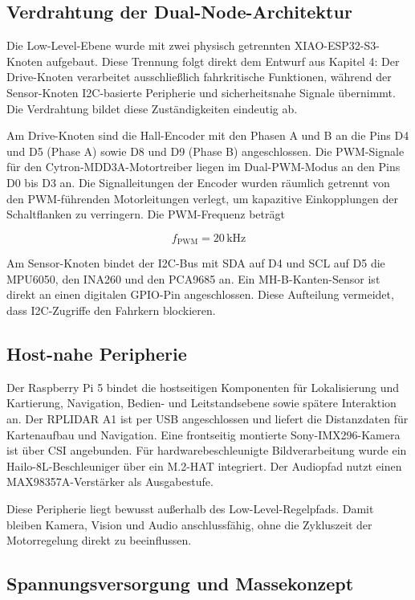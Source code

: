 \subsection{Verdrahtung der Dual-Node-Architektur}

Die Low-Level-Ebene wurde mit zwei physisch getrennten XIAO-ESP32-S3-Knoten aufgebaut. Diese Trennung folgt direkt dem Entwurf aus Kapitel 4: Der Drive-Knoten verarbeitet ausschließlich fahrkritische Funktionen, während der Sensor-Knoten I2C-basierte Peripherie und sicherheitsnahe Signale übernimmt. Die Verdrahtung bildet diese Zuständigkeiten eindeutig ab.

Am Drive-Knoten sind die Hall-Encoder mit den Phasen A und B an die Pins D4 und D5 (Phase A) sowie D8 und D9 (Phase B) angeschlossen. Die PWM-Signale für den Cytron-MDD3A-Motortreiber liegen im Dual-PWM-Modus an den Pins D0 bis D3 an. Die Signalleitungen der Encoder wurden räumlich getrennt von den PWM-führenden Motorleitungen verlegt, um kapazitive Einkopplungen der Schaltflanken zu verringern. Die PWM-Frequenz beträgt

$$f_{\mathrm{PWM}} = 20\,\mathrm{kHz}$$

Am Sensor-Knoten bindet der I2C-Bus mit SDA auf D4 und SCL auf D5 die MPU6050, den INA260 und den PCA9685 an. Ein MH-B-Kanten-Sensor ist direkt an einen digitalen GPIO-Pin angeschlossen. Diese Aufteilung vermeidet, dass I2C-Zugriffe den Fahrkern blockieren.

\subsection{Host-nahe Peripherie}

Der Raspberry Pi 5 bindet die hostseitigen Komponenten für Lokalisierung und Kartierung, Navigation, Bedien- und Leitstandsebene sowie spätere Interaktion an. Der RPLIDAR A1 ist per USB angeschlossen und liefert die Distanzdaten für Kartenaufbau und Navigation. Eine frontseitig montierte Sony-IMX296-Kamera ist über CSI angebunden. Für hardwarebeschleunigte Bildverarbeitung wurde ein Hailo-8L-Beschleuniger über ein M.2-HAT integriert. Der Audiopfad nutzt einen MAX98357A-Verstärker als Ausgabestufe.

Diese Peripherie liegt bewusst außerhalb des Low-Level-Regelpfads. Damit bleiben Kamera, Vision und Audio anschlussfähig, ohne die Zykluszeit der Motorregelung direkt zu beeinflussen.

\subsection{Spannungsversorgung und Massekonzept}

